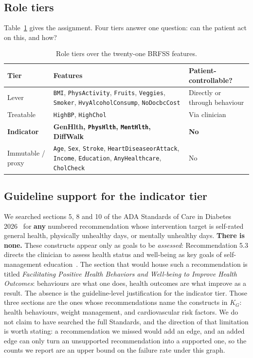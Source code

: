 \documentclass[conference]{IEEEtran}
\begin{document}
\subsection{Role tiers}
Table~\ref{tab:tiers} gives the assignment. Four tiers answer one question: can the patient act on this, and how?

\begin{table}[t]
\caption{Role tiers over the twenty-one BRFSS features.}
\label{tab:tiers}
\centering
\footnotesize
\begin{tabular}{@{}p{1.5cm}p{4.2cm}p{1.3cm}@{}}
\toprule
\textbf{Tier} & \textbf{Features} & \textbf{Patient-controllable?} \\
\midrule
Lever & \texttt{BMI}, \texttt{PhysActivity}, \texttt{Fruits}, \texttt{Veggies}, \texttt{Smoker}, \texttt{HvyAlcoholConsump}, \texttt{NoDocbcCost} & Directly or through behaviour \\
Treatable & \texttt{HighBP}, \texttt{HighChol} & Via clinician \\
\textbf{Indicator} & \textbf{GenHlth, \texttt{PhysHlth}, \texttt{MentHlth}, DiffWalk} & \textbf{No} \\
Immutable / proxy & \texttt{Age}, \texttt{Sex}, \texttt{Stroke}, \texttt{HeartDiseaseorAttack}, \texttt{Income}, \texttt{Education}, \texttt{AnyHealthcare}, \texttt{CholCheck} & No \\
\bottomrule
\end{tabular}
\end{table}

\subsection{Guideline support for the indicator tier}
We searched sections 5, 8 and 10 of the ADA Standards of Care in Diabetes 2026~\cite{ada2026s5,ada2026s8,ada2026s10} for \textbf{any} numbered recommendation whose intervention target is self-rated general health, physically unhealthy days, or mentally unhealthy days. \textbf{There is none.} These constructs appear only as goals to be \emph{assessed}: Recommendation 5.3 directs the clinician to assess health status and well-being as key goals of self-management education~\cite{ada2026s5}. The section that would house such a recommendation is titled \emph{Facilitating Positive Health Behaviors and Well-being to Improve Health Outcomes}: behaviours are what one does, health outcomes are what improve as a result. The absence is the guideline-level justification for the indicator tier. Those three sections are the ones whose recommendations name the constructs in $K_G$: health behaviours, weight management, and cardiovascular risk factors. We do not claim to have searched the full Standards, and the direction of that limitation is worth stating: a recommendation we missed would add an edge, and an added edge can only turn an unsupported recommendation into a supported one, so the counts we report are an upper bound on the failure rate under this graph.
\end{document}
